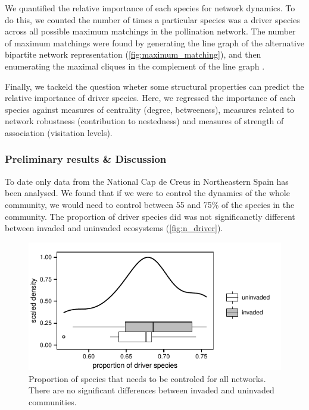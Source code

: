 \documentclass[a4paper]{article}
\begin{document}
We quantified the relative importance of each species for network dynamics. To do this, we counted the number of times a particular species was a driver species across all possible maximum matchings in the pollination network. The number of maximum matchings were found by generating the line graph of the alternative bipartite network representation (\autoref{fig:maximum_matching}), and then enumerating the maximal cliques in the complement of the line graph \autocite{Csardi2006}. 

Finally, we tackeld the question wheter some structural properties can predict the relative importance of driver species. Here, we regressed the importance of each species against measures of centrality (degree, betweeness), measures related to network robustness (contribution to nestedness) and measures of strength of association (visitation levels). 

\subsubsection*{Preliminary results \& Discussion} 

To date only data from the National Cap de Creus in Northeastern Spain has been analysed. We found that if we were to control the dynamics of the whole community, we would need to control between 55 and 75\% of the species in the community. The proportion of driver species did was not significanctly different between invaded and uninvaded ecosystems (\autoref{fig:n_driver}). 

\begin{figure}
    \centering
		\includegraphics{n_driver}
    \caption{
    Proportion of species that needs to be controled for all networks. There are no significant differences between invaded and uninvaded communities.
    }
    \label{fig:n_driver}
\end{figure} 
\end{document}
